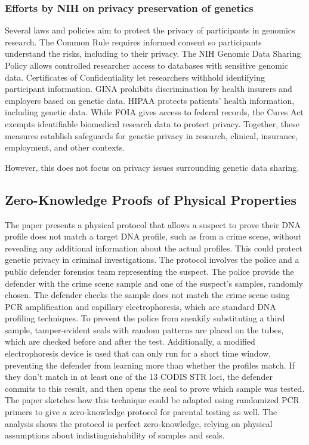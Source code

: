 \documentclass{article}
\begin{document}
\subsubsection{Efforts by NIH on privacy preservation of genetics}
Several laws and policies aim to protect the privacy of participants in genomics research. The Common Rule requires informed consent so participants understand the risks, including to their privacy. The NIH Genomic Data Sharing Policy allows controlled researcher access to databases with sensitive genomic data. Certificates of Confidentiality let researchers withhold identifying participant information. GINA prohibits discrimination by health insurers and employers based on genetic data. HIPAA protects patients' health information, including genetic data. While FOIA gives access to federal records, the Cures Act exempts identifiable biomedical research data to protect privacy. Together, these measures establish safeguards for genetic privacy in research, clinical, insurance, employment, and other contexts.

However, this does not focus on privacy issues surrounding genetic data sharing. 

\subsection{Zero-Knowledge Proofs of Physical Properties}
The paper \cite{fisch2014physical} presents a physical protocol that allows a suspect to prove their DNA profile does not match a target DNA profile, such as from a crime scene, without revealing any additional information about the actual profiles. This could protect genetic privacy in criminal investigations. The protocol involves the police and a public defender forensics team representing the suspect. The police provide the defender with the crime scene sample and one of the suspect's samples, randomly chosen. The defender checks the sample does not match the crime scene using PCR amplification and capillary electrophoresis, which are standard DNA profiling techniques. To prevent the police from sneakily substituting a third sample, tamper-evident seals with random patterns are placed on the tubes, which are checked before and after the test. Additionally, a modified electrophoresis device is used that can only run for a short time window, preventing the defender from learning more than whether the profiles match. If they don't match in at least one of the 13 CODIS STR loci, the defender commits to this result, and then opens the seal to prove which sample was tested. The paper sketches how this technique could be adapted using randomized PCR primers to give a zero-knowledge protocol for parental testing as well. The analysis shows the protocol is perfect zero-knowledge, relying on physical assumptions about indistinguishability of samples and seals.
\end{document}
